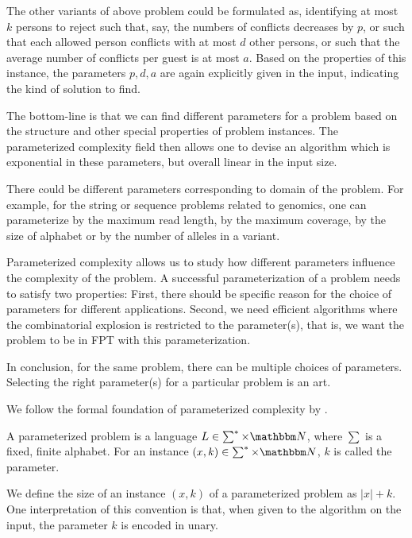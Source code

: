 The other variants of above problem could be formulated as, identifying at most $k$ persons to reject such that,
say, the numbers of conflicts decreases by $p$, or such that each allowed person conflicts with at most $d$ other persons,
or such that the average number of conflicts per guest is at most $a$. Based on the properties of this instance, the parameters $p, d, a$ are again explicitly given in the input,
indicating the kind of solution to find. 

The bottom-line is that we can find different parameters for a problem based on the structure and other special properties of problem instances.
The parameterized complexity field then allows one to devise an algorithm which is exponential in these parameters, but overall linear in the input size.

There could be different parameters corresponding to domain of the problem. For example, 
for the string or sequence problems related to genomics, one can parameterize by the maximum read length, by the maximum coverage,
by the size of alphabet or by the number of alleles in a variant.

Parameterized complexity allows us to study how different parameters influence the complexity of the problem.
A successful parameterization of a problem needs to satisfy two properties:
First, there should be specific reason for the choice of parameters for different applications.
Second, we need efficient algorithms where the combinatorial explosion is restricted to the parameter(s), that is, we want the problem to be in FPT with this parameterization.

In conclusion, for the same problem, there can be multiple choices of parameters. 
Selecting the right parameter(s) for a particular problem is an art.

We follow the formal foundation of parameterized complexity by \cite{cygan2015parameterized}.

\begin{definition}
 A parameterized problem is a language $L \in \sum^* \times \N$, where $\sum$ is a fixed, finite alphabet. For an instance $(x,k) \in \sum^* \times \N$, $k$ is called the parameter.
\end{definition}

We define the size of an instance $(x,k)$ of a parameterized problem as $|x| + k$. 
 One interpretation of this convention is that, when given to the algorithm on the input, the parameter $k$ is encoded in unary.


